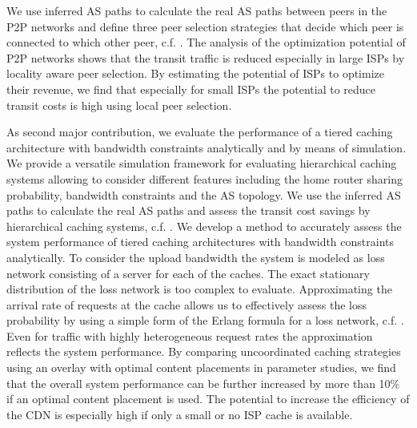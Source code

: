 We use inferred AS paths to calculate the real AS paths between peers in the P2P networks and define three peer selection strategies that decide which peer is connected to which other peer, c.f. \cite{burger2012profit}.
The analysis of the optimization potential of P2P networks shows that the transit traffic is reduced especially in large ISPs by locality aware peer selection.
By estimating the potential of ISPs to optimize their revenue, we find that especially for small ISPs the potential to reduce transit costs is high using local peer selection.

As second major contribution, we evaluate the performance of a tiered caching architecture with bandwidth constraints analytically and by means of simulation.
We provide a versatile simulation framework for evaluating hierarchical caching systems allowing to consider different features including the home router sharing probability, bandwidth constraints and the AS topology.
We use the inferred AS paths to calculate the real AS paths and assess the transit cost savings by hierarchical caching systems, c.f. \cite{lareida2015augmenting,rbhorst-demo}.
We develop a method to accurately assess the system performance of tiered caching architectures with bandwidth constraints analytically.
To consider the upload bandwidth the system is modeled as loss network consisting of a server for each of the caches.
The exact stationary distribution of the loss network is too complex to evaluate.
Approximating the arrival rate of requests at the cache allows us to effectively assess the loss probability by using a simple form of the Erlang formula for a loss network, c.f. \cite{burger2016hierarchical}.
Even for traffic with highly heterogeneous request rates the approximation reflects the system performance.
By comparing uncoordinated caching strategies using an overlay with optimal content placements in parameter studies, we find that the overall system performance can be further increased by more than 10\% if an optimal content placement is used.
The potential to increase the efficiency of the CDN is especially high if only a small or no ISP cache is available.

